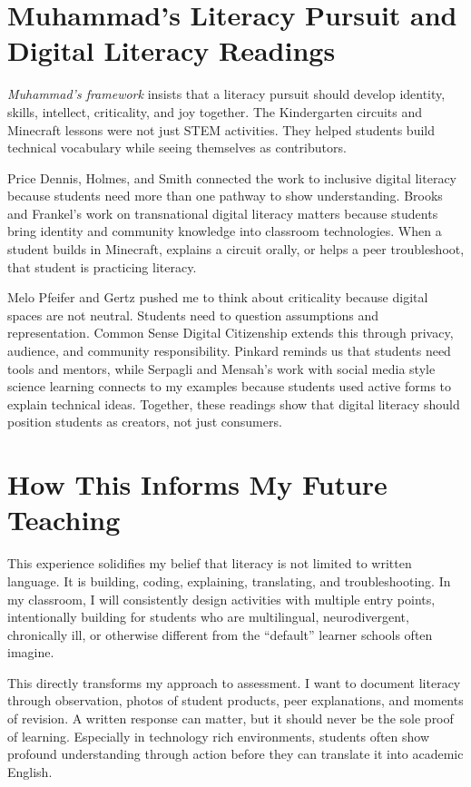 \documentclass[11pt]{article}
\begin{document}
\section*{Muhammad's Literacy Pursuit and Digital Literacy Readings}

\textit{Muhammad's framework} insists that a literacy pursuit should develop identity, skills, intellect, criticality, and joy together. The Kindergarten circuits and Minecraft lessons were not just STEM activities. They helped students build technical vocabulary while seeing themselves as contributors.

Price Dennis, Holmes, and Smith connected the work to inclusive digital literacy because students need more than one pathway to show understanding. Brooks and Frankel's work on transnational digital literacy matters because students bring identity and community knowledge into classroom technologies. When a student builds in Minecraft, explains a circuit orally, or helps a peer troubleshoot, that student is practicing literacy.

\newpage
Melo Pfeifer and Gertz pushed me to think about criticality because digital spaces are not neutral. Students need to question assumptions and representation. Common Sense Digital Citizenship extends this through privacy, audience, and community responsibility. Pinkard reminds us that students need tools and mentors, while Serpagli and Mensah's work with social media style science learning connects to my examples because students used active forms to explain technical ideas. Together, these readings show that digital literacy should position students as creators, not just consumers.

\section*{How This Informs My Future Teaching}

This experience solidifies my belief that literacy is not limited to written language. It is building, coding, explaining, translating, and troubleshooting. In my classroom, I will consistently design activities with multiple entry points, intentionally building for students who are multilingual, neurodivergent, chronically ill, or otherwise different from the ``default'' learner schools often imagine.

This directly transforms my approach to assessment. I want to document literacy through observation, photos of student products, peer explanations, and moments of revision. A written response can matter, but it should never be the sole proof of learning. Especially in technology rich environments, students often show profound understanding through action before they can translate it into academic English.
\end{document}
